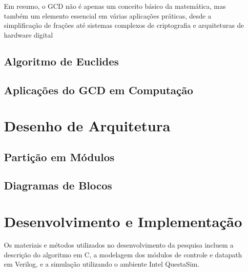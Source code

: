 \documentclass[a4paper,11pt]{article} %
\begin{document}
Em resumo, o GCD não é apenas um conceito básico da matemática, mas também um elemento essencial em várias aplicações práticas, desde a simplificação de frações até sistemas complexos de criptografia e arquiteturas de hardware digital

\subsection{Algoritmo de Euclides}

\subsection{Aplicações do GCD em Computação}

\section{Desenho de Arquitetura}

\subsection{Partição em Módulos}

\subsection{Diagramas de Blocos}

\section{Desenvolvimento e Implementação}

Os materiais e métodos utilizados no desenvolvimento da pesquisa incluem a descrição do algoritmo em C, a modelagem dos módulos de controle e datapath em Verilog, e a simulação utilizando o ambiente Intel QuestaSim.
\end{document}
